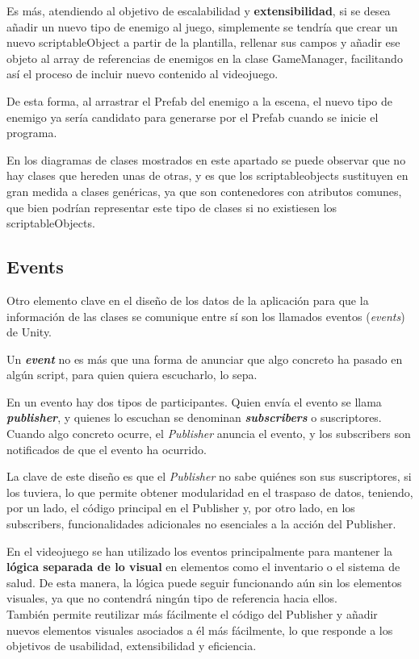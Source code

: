 Es más, atendiendo al objetivo de escalabilidad y \textbf{extensibilidad}, si se desea añadir un nuevo tipo de enemigo al juego, simplemente se tendría que crear un nuevo scriptableObject a partir de la plantilla, rellenar sus campos y añadir ese objeto al array de referencias de enemigos en la clase GameManager, facilitando así el proceso de incluir nuevo contenido al videojuego.

De esta forma, al arrastrar el Prefab del enemigo a la escena, el nuevo tipo de enemigo ya sería candidato para generarse por el Prefab cuando se inicie el programa.

En los diagramas de clases mostrados en este apartado se puede observar que no hay clases que hereden unas de otras, y es que los scriptableobjects sustituyen en gran medida a clases genéricas, ya que son contenedores con atributos comunes, que bien podrían representar este tipo de clases si no existiesen los scriptableObjects.

\subsection{Events} \label{Events}
Otro elemento clave en el diseño de los datos de la aplicación para que la información de las clases se comunique entre sí son los llamados eventos (\textit{events}) de Unity.

Un \textbf{\textit{event}} no es más que una forma de anunciar que algo concreto ha pasado en algún script, para quien quiera escucharlo, lo sepa.

En un evento hay dos tipos de participantes. Quien envía el evento se llama \textbf{\textit{publisher}}, y quienes lo escuchan se denominan \textbf{\textit{subscribers}} o suscriptores. Cuando algo concreto ocurre, el \textit{Publisher} anuncia el evento, y los subscribers son notificados de que el evento ha ocurrido.

La clave de este diseño es que el \textit{Publisher} no sabe quiénes son sus suscriptores, si los tuviera, lo que permite obtener modularidad en el traspaso de datos, teniendo, por un lado, el código principal en el Publisher y, por otro lado, en los subscribers, funcionalidades adicionales no esenciales a la acción del Publisher.

En el videojuego se han utilizado los eventos principalmente para mantener la \textbf{lógica separada de lo visual} en elementos como el inventario o el sistema de salud. De esta manera, la lógica puede seguir funcionando aún sin los elementos visuales, ya que no contendrá ningún tipo de referencia hacia ellos.\\
También permite reutilizar más fácilmente el código del Publisher y añadir nuevos elementos visuales asociados a él más fácilmente, lo que responde a los objetivos de usabilidad, extensibilidad y eficiencia.

